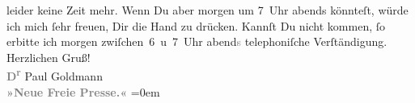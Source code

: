 \begin{ledgroupsized}[t]{13cm}
               leider keine Zeit mehr. Wenn Du {\pb}aber morgen um 7 Uhr{ }\introOben{}abends\introOben{}{ }\label{K-L03234-2v}\label{K-L03234-2h} könnteſt, würde ich mich ſehr
               freuen, Dir die Hand zu drücken. Kannſt Du nicht kommen, ſo erbitte ich morgen{ }zwiſchen 6 u 7 Uhr abend\textcolor{gray}{s} telephoniſche
               Verſtändigung.\pend
           \pstart
           Herzlichen Gruß! {\\[\baselineskip]}\textcolor{gray}{\textbf{D\textsuperscript{r}}} Paul Goldmann {\\[\baselineskip]}\textcolor{gray}{\textbf{»Neue Freie Presse.«}}\pend
           \leftskip=0em{}
         
         \endnumbering{}\end{ledgroupsized}  \newcommand{\dateiname}{L03234}\newcommand{\titel}{Paul Goldmann an Arthur Schnitzler, 20. 11. [1905]}\newcommand{\editorInnen}{Martin Anton Müller und Laura Untner}
      
